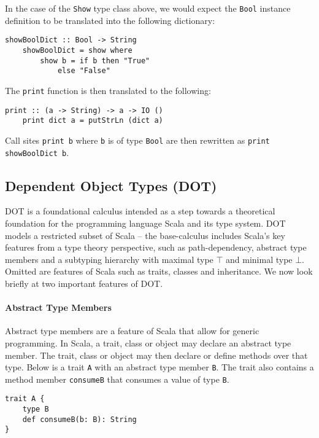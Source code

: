 In the case of the \texttt{Show} type class above, we would expect the
\texttt{Bool} instance definition to be translated into the following
dictionary:
\begin{lstlisting}[mathescape]
    showBoolDict :: Bool -> String
    showBoolDict = show where
        show b = if b then "True"
            else "False"
\end{lstlisting}

\noindent The \texttt{print} function is then translated to the following:
\begin{lstlisting}[mathescape]
    print :: (a -> String) -> a -> IO ()
    print dict a = putStrLn (dict a)
\end{lstlisting}

\noindent Call sites \texttt{print b} where \texttt{b} is of type \texttt{Bool}
are then rewritten as \texttt{print showBoolDict b}.

\subsection{Dependent Object Types (DOT)}
DOT \cite{AMO12, ARO14, AR16, AGORS16, AR17} is a foundational calculus
intended as a step towards a theoretical foundation for the programming
language Scala and its type system. DOT models a restricted subset of Scala --
the base-calculus includes Scala's key features from a type theory perspective,
such as path-dependency, abstract type members and a subtyping hierarchy with
maximal type $\top$ and minimal type $\bot$. Omitted are features of Scala such
as traits, classes and inheritance. We now look briefly at two important
features of DOT.

\paragraph{Abstract Type Members}
Abstract type members are a feature of Scala that allow for generic programming.
In Scala, a trait, class or object may declare an abstract type member. The
trait, class or object may then declare or define methods over that type. Below
is a trait \texttt{A} with an abstract type member \texttt{B}. The trait also
contains a method member \texttt{consumeB} that consumes a value of type
\texttt{B}.

\begin{minipage}{\linewidth}
\begin{lstlisting}[mathescape]
trait A {
    type B
    def consumeB(b: B): String
}
\end{lstlisting}
\end{minipage}

